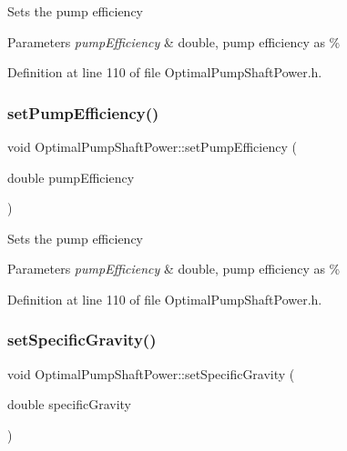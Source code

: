 Sets the pump efficiency 
\begin{DoxyParams}{Parameters}
{\em pump\+Efficiency} & double, pump efficiency as \% \\
\hline
\end{DoxyParams}


Definition at line 110 of file Optimal\+Pump\+Shaft\+Power.\+h.

\mbox{\label{class_optimal_pump_shaft_power_a2cb2c6b537c7db0bc5071f09c66308d0}} 
\subsubsection{\texorpdfstring{set\+Pump\+Efficiency()}{setPumpEfficiency()}\hspace{0.1cm}{\footnotesize\ttfamily [3/3]}}
{\footnotesize\ttfamily void Optimal\+Pump\+Shaft\+Power\+::set\+Pump\+Efficiency (\begin{DoxyParamCaption}\item[{double}]{pump\+Efficiency }\end{DoxyParamCaption})\hspace{0.3cm}{\ttfamily [inline]}}

Sets the pump efficiency 
\begin{DoxyParams}{Parameters}
{\em pump\+Efficiency} & double, pump efficiency as \% \\
\hline
\end{DoxyParams}


Definition at line 110 of file Optimal\+Pump\+Shaft\+Power.\+h.

\mbox{\label{class_optimal_pump_shaft_power_aa565a332e4b144c8eb85fd06c541199e}} 
\subsubsection{\texorpdfstring{set\+Specific\+Gravity()}{setSpecificGravity()}\hspace{0.1cm}{\footnotesize\ttfamily [1/3]}}
{\footnotesize\ttfamily void Optimal\+Pump\+Shaft\+Power\+::set\+Specific\+Gravity (\begin{DoxyParamCaption}\item[{double}]{specific\+Gravity }\end{DoxyParamCaption})\hspace{0.3cm}{\ttfamily [inline]}}

